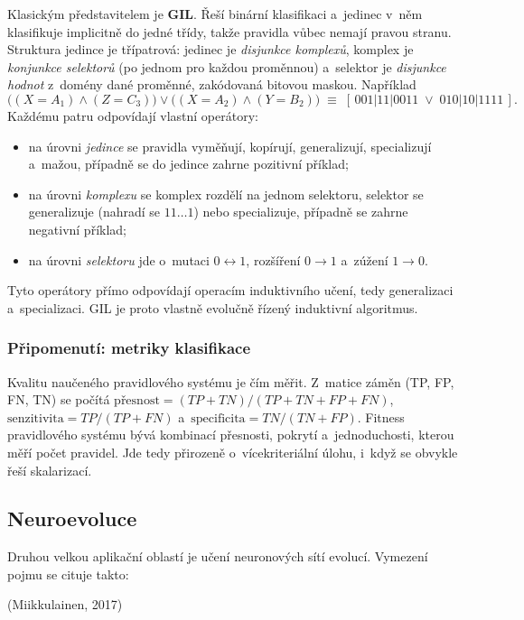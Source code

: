 \documentclass[11pt,a4paper]{article}
\theoremstyle{definition}
\begin{document}
Klasickým představitelem je \textbf{GIL}. Řeší binární klasifikaci a~jedinec v~něm klasifikuje
implicitně do jedné třídy, takže pravidla vůbec nemají pravou stranu.
Struktura jedince je třípatrová: jedinec je \emph{disjunkce komplexů}, komplex je
\emph{konjunkce selektorů} (po jednom pro každou proměnnou) a~selektor je \emph{disjunkce
hodnot} z~domény dané proměnné, zakódovaná bitovou maskou. Například
\[
\big((X{=}A_1) \wedge (Z{=}C_3)\big) \vee \big((X{=}A_2) \wedge (Y{=}B_2)\big)
\;\equiv\;
[\,001|11|0011 \;\vee\; 010|10|1111\,].
\]
Každému patru odpovídají vlastní operátory:
\begin{itemize}
\item na úrovni \emph{jedince} se pravidla vyměňují, kopírují, generalizují, specializují
  a~mažou, případně se do jedince zahrne pozitivní příklad;
\item na úrovni \emph{komplexu} se komplex rozdělí na jednom selektoru, selektor se
  generalizuje (nahradí se $11\ldots1$) nebo specializuje, případně se zahrne negativní
  příklad;
\item na úrovni \emph{selektoru} jde o~mutaci $0 \leftrightarrow 1$, rozšíření $0 \to 1$
  a~zúžení $1 \to 0$.
\end{itemize}
Tyto operátory přímo odpovídají operacím induktivního učení, tedy generalizaci
a~specializaci. GIL je proto vlastně evolučně řízený induktivní algoritmus.

\subsubsection{Připomenutí: metriky klasifikace}

Kvalitu naučeného pravidlového systému je čím měřit. Z~matice záměn (TP, FP, FN, TN) se
počítá
$\text{přesnost} = (TP+TN)/(TP+TN+FP+FN)$,
$\text{senzitivita} = TP/(TP+FN)$ a~$\text{specificita} = TN/(TN+FP)$.
Fitness pravidlového systému bývá kombinací přesnosti, pokrytí a~jednoduchosti, kterou měří
počet pravidel. Jde tedy přirozeně o~vícekriteriální úlohu, i~když se obvykle řeší skalarizací.

\subsection{Neuroevoluce}
\label{sec:neuro}

Druhou velkou aplikační oblastí je učení neuronových sítí evolucí. Vymezení pojmu se cituje
takto:

\begin{defbox}
 (Miikkulainen, 2017)
\end{defbox}
\end{document}
